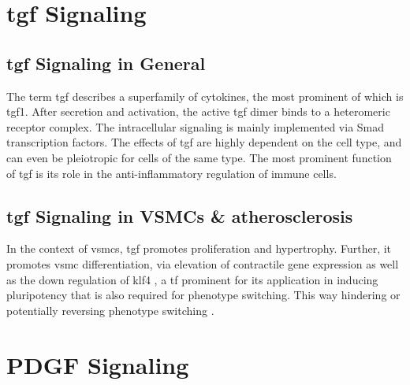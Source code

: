 \section{\ac{tgf} Signaling}
\label{sec:tgf}

    \subsection{\ac{tgf} Signaling in General}
    \label{subsec:tgf_the_cytokine}
    The term \ac{tgf} describes a superfamily of cytokines, the most prominent of which is \ac{tgf}1. After secretion and activation, the active \ac{tgf} dimer binds to a heteromeric receptor complex. The intracellular signaling is mainly implemented via Smad transcription factors. The effects of \ac{tgf} are highly dependent on the cell type, and can even be pleiotropic for cells of the same type. The most prominent function of \ac{tgf} is its role in the anti-inflammatory regulation of immune cells. \cite{goumansTGFvSignalingControl2018, batlleTransformingGrowthFactorv2019}

    \subsection{\ac{tgf} Signaling in VSMCs \& atherosclerosis}
    \label{subsec:pdf_signaling}
    In the context of \acp{vsmc}, \ac{tgf} promotes proliferation and hypertrophy. Further, it promotes \ac{vsmc} differentiation, via elevation of contractile gene expression as well as the down regulation of \ac{klf4} \cite{davis-dusenberyDownregulationKruppellikeFactor42011}, a \ac{tf} prominent for its application in inducing pluripotency \cite{takahashiInductionPluripotentStem2007} that is also required for phenotype switching. This way hindering \cite{davis-dusenberyDownregulationKruppellikeFactor42011} or potentially reversing phenotype switching \cite{panSingleCellGenomicsReveals2020}.

\section{PDGF Signaling}
\label{sec:pdgf}
